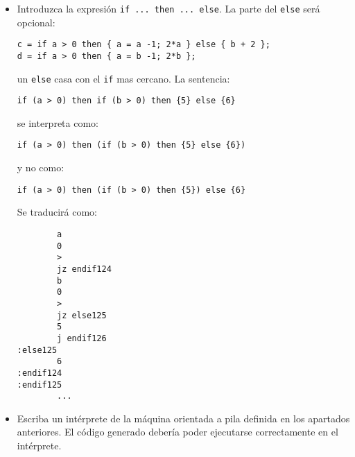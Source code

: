 \begin{itemize}
\item Introduzca la expresión \verb|if ... then ... else|. La parte del \verb|else|
será opcional:
\begin{verbatim}
c = if a > 0 then { a = a -1; 2*a } else { b + 2 };
d = if a > 0 then { a = b -1; 2*b }; 
\end{verbatim}
un \verb|else| casa con el \verb|if| mas cercano. 
La sentencia:
\begin{verbatim}
if (a > 0) then if (b > 0) then {5} else {6}
\end{verbatim}
se interpreta como:
\begin{verbatim}
if (a > 0) then (if (b > 0) then {5} else {6})
\end{verbatim}
y no como:
\begin{verbatim}
if (a > 0) then (if (b > 0) then {5}) else {6}
\end{verbatim}
Se traducirá como:
\begin{verbatim}
        a
        0
        >
        jz endif124
        b
        0
        >
        jz else125
        5
        j endif126
:else125
        6
:endif124
:endif125
        ...

\end{verbatim}
\item Escriba un intérprete de la máquina orientada a pila definida en los apartados anteriores.
El código generado debería poder ejecutarse correctamente en el intérprete.
\end{itemize}
